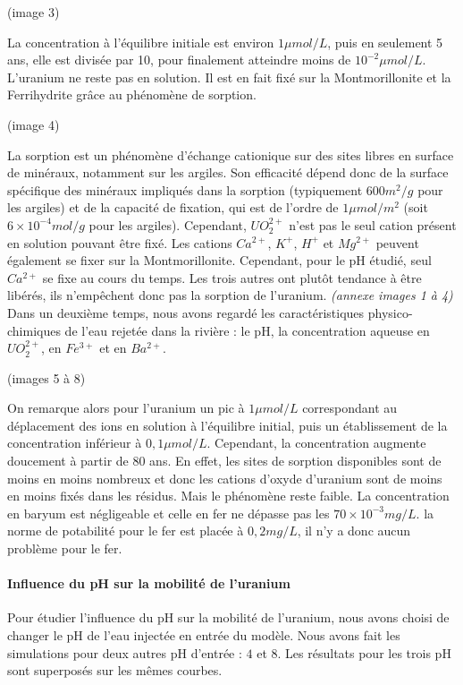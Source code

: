 \documentclass{article}
\begin{document}
(image 3)

La concentration à l’équilibre initiale est environ $1 \mu mol/L$, puis en seulement 5 ans, elle est divisée par 10, pour finalement atteindre moins de $10^{-2} \mu mol/L$. L’uranium ne reste pas en solution. Il est en fait fixé sur la Montmorillonite et la Ferrihydrite grâce au phénomène de sorption.

(image 4)

La sorption est un phénomène d’échange cationique sur des sites libres en surface de minéraux, notamment sur les argiles. Son efficacité dépend donc de la surface spécifique des minéraux impliqués dans la sorption (typiquement $600 m^2/g$ pour les argiles) et de la capacité de fixation, qui est de l’ordre de $1 \mu mol/m^2$ (soit $6 \times 10^{-4} mol/g$ pour les argiles). Cependant, $UO_2^{2+}$ n’est pas le seul cation présent en solution pouvant être fixé. Les cations $Ca^{2+}$, $K^{+}$, $H^{+}$ et $Mg^{2+}$ peuvent également se fixer sur la Montmorillonite. Cependant, pour le pH étudié, seul $Ca^{2+}$ se fixe au cours du temps. Les trois autres ont plutôt tendance à être libérés, ils n’empêchent donc pas la sorption de l’uranium. \emph{(annexe images 1 à 4)}
Dans un deuxième temps, nous avons regardé les caractéristiques physico-chimiques de l’eau rejetée dans la rivière : le pH, la concentration aqueuse en $UO_2^{2+}$, en $Fe^{3+}$ et en $Ba^{2+}$.

(images 5 à 8)

On remarque alors pour l’uranium un pic à $1 \mu mol/L$ correspondant au déplacement des ions en solution à l’équilibre initial, puis un établissement de la concentration inférieur à $0,1 \mu mol/L$. Cependant, la concentration augmente doucement à partir de 80 ans. En effet, les sites de sorption disponibles sont de moins en moins nombreux et donc les cations d’oxyde d’uranium sont de moins en moins fixés dans les résidus. Mais le phénomène reste faible. La concentration en baryum est négligeable et celle en fer ne dépasse pas les $70 \times 10^{-3} mg/L$. la norme de potabilité pour le fer est placée à $0,2 mg/L$, il n’y a donc aucun problème pour le fer.


\paragraph{Influence du pH sur la mobilité de l'uranium}

Pour étudier l’influence du pH sur la mobilité de l’uranium, nous avons choisi de changer le pH de l’eau injectée en entrée du modèle. Nous avons fait les simulations pour deux autres pH d’entrée : $4$ et $8$. Les résultats pour les trois pH sont superposés sur les mêmes courbes.
\end{document}
